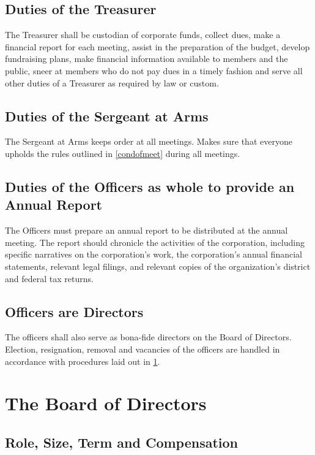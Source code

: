\documentclass[10pt,letterpaper,titlepage]{article}
\begin{document}
\subsection{Duties of the Treasurer}

The Treasurer shall be custodian of corporate funds, collect dues, make a
financial report for each meeting, assist in the preparation of the budget,
develop fundraising plans, make financial information available to members and
the public, sneer at members who do not pay dues in a timely fashion and serve
all other duties of a Treasurer as required by law or custom.

\subsection{Duties of the Sergeant at Arms}

The Sergeant at Arms keeps order at all meetings.
Makes sure that everyone upholds the rules outlined in \ref{condofmeet} during
all meetings.

\subsection{Duties of the Officers as whole to provide an Annual Report}

The Officers must prepare an annual report to be distributed at the annual
meeting.
The report should chronicle the activities of the corporation, including
specific narratives on the corporation's work, the corporation's annual
financial statements, relevant legal filings, and relevant copies of the
organization's district and federal tax returns.

\subsection{Officers are Directors}

The officers shall also serve as bona-fide directors on the Board of Directors.
Election, resignation, removal and vacancies of the officers are handled in
accordance with procedures laid out in \ref{boardofdirect}.

\section{The Board of Directors}
\label{boardofdirect}

\subsection{Role, Size, Term and Compensation}
\end{document}
